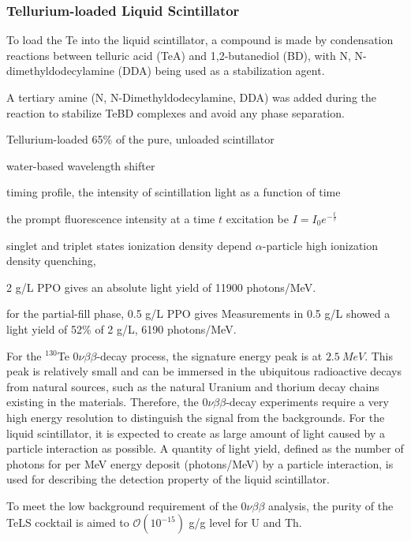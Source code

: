 \subsubsection{Tellurium-loaded Liquid Scintillator}\label{sect:TeLS_SNO+}

To load the Te into the liquid scintillator, a compound is made by 
condensation reactions between telluric acid (TeA) and 1,2-butanediol (BD), with N, N-dimethyldodecylamine (DDA) being used as a stabilization agent.

A tertiary amine (N, N-Dimethyldodecylamine, DDA) was added during the reaction to stabilize TeBD complexes and avoid any phase separation. 


Tellurium-loaded 65\% of the pure, unloaded scintillator



water-based wavelength shifter


timing profile, the intensity of scintillation light as a function of time

the prompt fluorescence intensity at a time $t$ excitation be $I=I_0e^{-\frac{t}{\tau}}$



singlet and triplet states 
ionization density 
depend
$\alpha$-particle
high ionization density 
quenching, 




2 g/L PPO gives an absolute light yield of 11900 photons/MeV.


for the partial-fill phase, 0.5 g/L PPO gives Measurements in 0.5 g/L showed a light yield of 52\% of 2 g/L,  
6190 photons/MeV\cite{tanner0p5,joshW1}.

For the $^{130}${Te} $0\nu\beta\beta$-decay process, the signature energy peak is at $2.5~MeV$\cite{whitepaper}. This peak is relatively small and can be immersed in the ubiquitous radioactive decays from natural sources, such as the natural Uranium and thorium decay chains existing in the materials\cite{whitepaper}. Therefore, the $0\nu\beta\beta$-decay experiments require a very high energy resolution to distinguish the signal from the backgrounds. For the liquid scintillator, it is expected to create as large amount of light caused by a particle interaction as possible. A quantity of light yield, defined as the number of photons for per MeV energy deposit (photons/MeV) by a particle interaction, is used for describing the detection property of the liquid scintillator.

To meet the low background requirement of the $0\nu\beta\beta$ analysis, the purity of the TeLS cocktail is aimed to $\mathcal{O}(10^{-15})$ g/g level for U and Th. 

